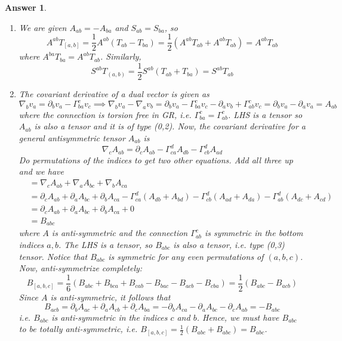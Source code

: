 \documentclass[a4paper]{article}
\theoremstyle{new2}
\newtheorem{ans}{Answer}[section]
\theoremstyle{new}
\begin{document}
\begin{ans}\leavevmode
\begin{enumerate}[label=(\alph*)]
\item We are given $A_{ab}=-A_{ba}$ and $S_{ab}=S_{ba}$, so
$$A^{ab}T_{[a,b]}=\frac{1}{2}A^{ab}(T_{ab}-T_{ba})=\frac{1}{2}(A^{ab}T_{ab}+A^{ab}T_{ab})=A^{ab}T_{ab}$$
where $A^{ba}T_{ba}=A^{ab}T_{ab}$. Similarly,
$$S^{ab}T_{(a,b)}=\frac{1}{2}S^{ab}(T_{ab}+T_{ba})=S^{ab}T_{ab}$$
\item The covariant derivative of a dual vector is given as
$$\nabla_bv_a=\partial_bv_a-\Gamma^c_{ba}v_c\implies \nabla_bv_a-\nabla_av_b=\partial_bv_a-\Gamma_{ba}^cv_c-\partial_av_b+\Gamma_{ab}^cv_c=\partial_bv_a-\partial_av_a=A_{ab}$$
where the connection is torsion free in GR, i.e. $\Gamma_{ba}^c=\Gamma^c_{ab}$. LHS is a tensor so $A_{ab}$ is also a tensor and it is of type (0,2). Now, the covariant derivative for a general antisymmetric tensor $A_{ab}$ is
$$\nabla_cA_{ab}=\partial_cA_{ab}-\Gamma_{ca}^dA_{db}-\Gamma_{cb}^dA_{ad}$$
Do permutations of the indices to get two other equations. Add all three up and we have
\begin{align}
&=\nabla_cA_{ab}+\nabla_aA_{bc}+\nabla_bA_{ca}\nonumber\\&=\partial_cA_{ab}+\partial_aA_{bc}+\partial_bA_{ca}-\Gamma_{ca}^d(A_{db}+A_{bd})-\Gamma^d_{cb}(A_{ad}+A_{da})-\Gamma^d_{ab}(A_{dc}+A_{cd})\nonumber\\&=\partial_cA_{ab}+\partial_aA_{bc}+\partial_bA_{ca}+0\nonumber\\&=B_{abc}\nonumber
\end{align}
where $A$ is anti-symmetric and the connection $\Gamma_{ab}^c$ is symmetric in the bottom indices $a,b$. The LHS is a tensor, so $B_{abc}$ is also a tensor, i.e. type (0,3) tensor. Notice that $B_{abc}$ is symmetric for any even permutations of $(a,b,c)$. Now, anti-symmetrize completely:
$$B_{[a,b,c]}=\frac{1}{6}(B_{abc}+B_{bca}+B_{cab}-B_{bac}-B_{acb}-B_{cba})=\frac{1}{2}(B_{abc}-B_{acb})$$
Since $A$ is anti-symmetric, it follows that
$$B_{acb}=\partial_bA_{ac}+\partial_aA_{cb}+\partial_cA_{ba}=-\partial_bA_{ca}-\partial_aA_{bc}-\partial_cA_{ab}=-B_{abc}$$
i.e. $B_{abc}$ is anti-symmetric in the indices $c$ and $b$. Hence, we must have $B_{abc}$ to be totally anti-symmetric, i.e. $B_{[a,b,c]}=\frac{1}{2}(B_{abc}+B_{abc})=B_{abc}$.
\end{enumerate}
\end{ans}
\newpage
\end{document}
